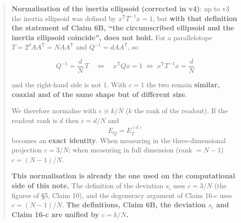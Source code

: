 \documentclass[
  10pt,
]{article}
\begin{document}
\begin{quote}
\textbf{Normalisation of the inertia ellipsoid (corrected in v4)}: up to
v3 the inertia ellipsoid was defined by \(x^{\mathsf T}T^{-1}x = 1\),
but \textbf{with that definition the statement of Claim 6B, ``the
circumscribed ellipsoid and the inertia ellipsoid coincide'', does not
hold.} For a parallelotope \(T = 2^dAA^{\mathsf T} = NAA^{\mathsf T}\)
and \(Q^{-1} = dAA^{\mathsf T}\), so

\[Q^{-1} = \frac{d}{N}\,T \quad\Longleftrightarrow\quad x^{\mathsf T}Qx = 1 \;\iff\; x^{\mathsf T}T^{-1}x = \frac{d}{N}\]

and the right-hand side is not \(1\). With \(c = 1\) the two remain
\textbf{similar, coaxial and of the same shape but of different size}.

We therefore normalise with \(c \equiv k/N\) (\(k\) the rank of the
readout). If the readout rank is \(d\) then \(c = d/N\) and
\[\boxed{\;E_Q = E_T^{(d)}\;}\] becomes an \textbf{exact identity}. When
measuring in the three-dimensional projection \(c = 3/N\); when
measuring in full dimension (rank \(= N-1\)) \(c = (N-1)/N\).

\textbf{This normalisation is already the one used on the computational
side of this note.} The definition of the deviation \(s_i\) uses
\(c = 3/N\) (the figures of §5, Claim 10), and the degeneracy argument
of Claim 16-c uses \(c = (N-1)/N\). \textbf{The definitions, Claim 6B,
the deviation \(s_i\) and Claim 16-c are unified by \(c = k/N\).}
\end{quote}
\end{document}
